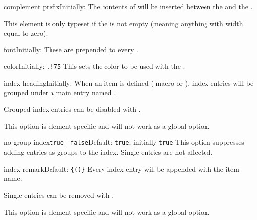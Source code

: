 \documentclass[11pt, outputdir = ./out]{article}
\begin{document}
\begin{Optiondef}{complement prefix}{}{Initially: }
    The contents of  will be inserted between the  and the .

    This element is only typeset if the  is not empty (meaning anything with width equal to zero).
\end{Optiondef}

\begin{Optiondef}{font}{}{Initially: }
    These  are prepended to every .
\end{Optiondef}

\begin{Optiondef}{color}{}{Initially: \texttt{.!75}}
    This sets the color to be used with the .
\end{Optiondef}

\begin{Optiondef}{index heading}{}{Initially: }
    When an item is defined ( macro or \hyperref[environmentdef]{}), index entries will be grouped under a main entry named .

    Grouped index entries can be disabled with .

    This option is element-specific and will not work as a global option.
\end{Optiondef}

\begin{Optiondef}{no group index}{\texttt{true} | \texttt{false}}{Default: \texttt{true}; initially \texttt{true}}
    This option suppresses adding entries as groups to the index. Single entries are not affected.
\end{Optiondef}

\begin{Optiondef}{index remark}{}{Default: \texttt{\{\DocsTilde()\}}}
    Every index entry will be appended with  the item name.

    Single entries can be removed with .

    This option is element-specific and will not work as a global option.
\end{Optiondef}
\end{document}
